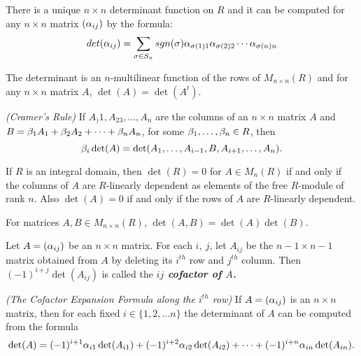 \nl

\begin{thm}
There is a unique $n\times n$ determinant function on $R$ and it can be computed for any $n\times n$ matrix $(\alpha_{ij})$ by the formula:
\[det(\alpha_{ij}) = \sum_{\sigma\in S_n} sgn(\sigma) \alpha_{\sigma(1)1} \alpha_{\sigma(2)2} \cdots \alpha_{\sigma(n)n}\]
\end{thm}

\nl

\begin{cor}
The determinant is an $n$-multilinear function of the rows of $M_{n\times n}(R)$ and for any $n\times n $ matrix $A$, $\det(A) = \det(A^t)$.
\end{cor}

\nl

\begin{thm}\textit{(Cramer's Rule)}
If $A_)1,A_23,\ldots, A_n$ are the columns of an $n\times n$ matrix $A$ and $B = \beta_1A_1 + \beta_2A_2 + \cdots + \beta_nA_n$, for some $\beta_1,\ldots, \beta_n\in R$, then
\[\beta_i\det(A) = \det(A_1,\ldots,A_{i-1}, B, A_{i+1},\ldots, A_n).\]
\end{thm}

\nl

\begin{cor}
If $R$ is an integral domain, then $\det(R) = 0$ for $A\in M_n(R)$ if and only if the columns of $A$ are $R$-linearly dependent as elements of the free $R$-module of rank $n$. Also $\det(A) = 0$ if and only if the rows of $A$ are $R$-linearly dependent.
\end{cor}

\nl

\begin{thm}
For matrices $A, B\in M_{n\times n}(R)$, $\det(A,B) = \det(A)\det(B)$.
\end{thm}

\nl

\begin{defn}
Let $A = (\alpha_{ij})$ be an $n\times n$ matrix. For each $i,\ j$, let $A_{ij}$ be the $n-1\times n-1$ matrix obtained from $A$ by deleting its $i^{th}$ row and $j^{th}$ column. Then $(-1)^{i + j}\det(A_{ij})$ is called the \textit{\textbf{$ij$ cofactor of $A$.}}
\end{defn}

\nl

\begin{thm}\textit{(The Cofactor Expansion Formula along the $i^{th}$ row)}
If $A = (\alpha_{ij})$ is an $n\times n$ matrix, then for each fixed $i\in \{1,2,\ldots n\}$ the determinant of $A$ can be computed from the formula
\[\det(A) = (-1)^{i+1}\alpha_{i1}\det(A_{i1}) + (-1)^{i+2}\alpha_{i2}\det(A_{i2}) + \cdots + (-1)^{i+n}\alpha_{in}\det(A_{in}).\]
\end{thm}

